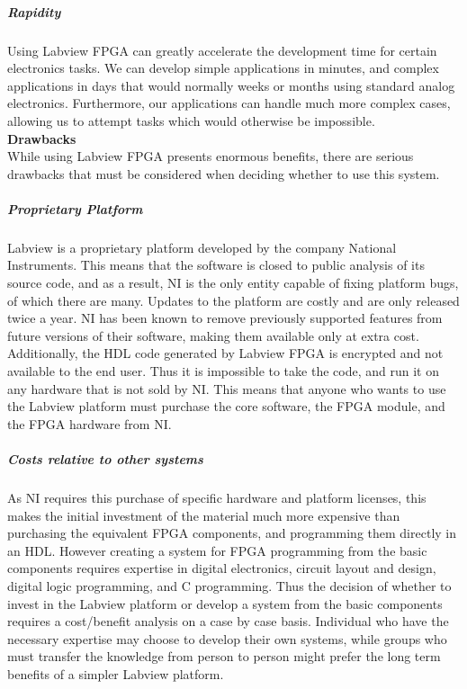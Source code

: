 \subparagraph{Rapidity} 
Using  Labview FPGA can greatly accelerate the development time for certain electronics tasks.  We can develop simple applications in minutes, and complex applications in days that would normally weeks or months using standard analog electronics.  Furthermore, our applications can handle much more complex cases, allowing us to attempt tasks which would otherwise be impossible.
\\[2em]

\noindent
\Large
\textbf{Drawbacks}
\normalsize
\\[1em]
While using Labview FPGA presents enormous benefits, there are serious drawbacks that must be considered when deciding whether to use this system.

\subparagraph{Proprietary Platform} 

Labview is a proprietary platform developed by the company National
Instruments.  This means that the software is closed to public analysis of its
source code, and as a result, NI is the only entity capable of fixing
platform bugs, of which there are many.  Updates to the platform are costly
and are only released twice a year.  NI has been known to remove previously
supported features from future versions of their software, making them
available only at extra cost.
Additionally, the HDL code generated by Labview FPGA is encrypted and not available to the end user.  Thus it is impossible to take the code, and run it on any hardware that is not sold by NI.  This means that anyone who wants to use the Labview platform must purchase the core software, the FPGA module, and the FPGA hardware from NI.

\subparagraph{Costs relative to other systems} 

As NI requires this purchase of specific hardware and platform licenses, this
makes the initial investment of the material much more expensive than
purchasing the equivalent FPGA components, and programming them directly in an HDL.  However creating a system for FPGA programming from the basic components requires expertise in digital electronics, circuit layout and design, digital logic programming, and C programming.  Thus the decision of whether to invest in the Labview platform or develop a system from the basic components requires a cost/benefit analysis on a case by case basis.  Individual who have the necessary expertise may choose to develop their own systems, while groups who must transfer the knowledge from person to person might prefer the long term benefits of a simpler Labview platform.




